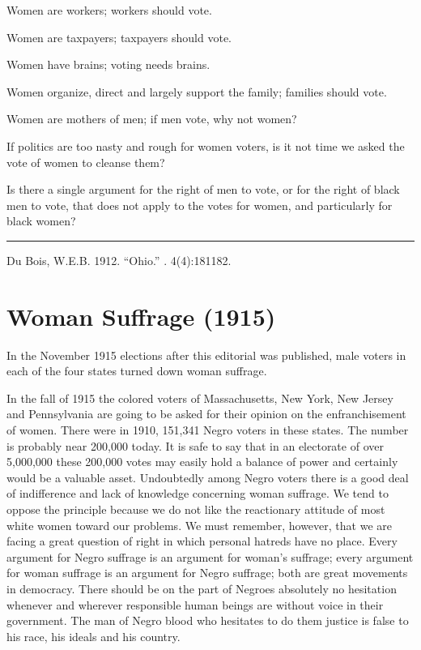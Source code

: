 \documentclass[letterpaper,10pt,english]{jupyterBook}
\begin{document}
\sphinxAtStartPar
Women are workers; workers should vote.

\sphinxAtStartPar
Women are taxpayers; taxpayers should vote.

\sphinxAtStartPar
Women have brains; voting needs brains.

\sphinxAtStartPar
Women organize, direct and largely support the family; families should vote.

\sphinxAtStartPar
Women are mothers of men; if men vote, why not women?

\sphinxAtStartPar
If politics are too nasty and rough for women voters, is it not time we asked the vote of women to cleanse them?

\sphinxAtStartPar
Is there a single argument for the right of men to vote, or for the right of black men to vote, that does not apply to the votes for women, and particularly for black women?


\bigskip\hrule\bigskip


\sphinxAtStartPar
{} Du Bois, W.E.B. 1912. “Ohio.”  . 4(4):181\sphinxhyphen{}182.


\section{Woman Suffrage (1915)}
\label{\detokenize{Volumes/09/06/womansuffrage:woman-suffrage-1915}}\label{\detokenize{Volumes/09/06/womansuffrage::doc}}
\begin{sphinxShadowBox}
\sphinxstylesidebartitle{}

\sphinxAtStartPar
In the November 1915 elections after this editorial was published, male voters in each of the four states turned down woman suffrage.
\end{sphinxShadowBox}

\sphinxAtStartPar
In the fall of 1915 the colored voters of Massachusetts, New York, New Jersey and Pennsylvania are going to be asked for their opinion on the enfranchisement of women. There were in 1910, 151,341 Negro voters in these states. The number is probably near 200,000 today. It is safe to say that in an electorate of over 5,000,000 these 200,000 votes may easily hold a balance of power and certainly would be a valuable asset. Undoubtedly among Negro voters there is a good deal of indifference and lack of knowledge concerning woman suffrage. We tend to oppose the principle because we do not like the reactionary attitude of most white women toward our problems. We must remember, however, that we are facing a great question of right in which personal hatreds have no place. Every argument for Negro suffrage is an argument for woman’s suffrage; every argument for woman suffrage is an argument for Negro suffrage; both are great movements in democracy. There should be on the part of Negroes absolutely no hesitation whenever and wherever responsible human beings are without voice in their government. The man of Negro blood who hesitates to do them justice is false to his race, his ideals and his country.
\end{document}

